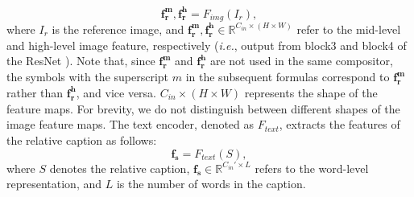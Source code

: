 \documentclass[sigconf]{acmart}
\def\ie{\emph{i.e.}}
\begin{document}
\begin{equation}
    \bm{f^m_r}, \bm{f^h_r} = F_{img}(I_r),
\end{equation}
where $I_r$  is the reference image, and $\bm{f^m_r}, \bm{f^h_r} \in \mathbb{R}^{C_{in} \times (H \times W)}$ refer to the mid-level and high-level image feature, respectively (\ie, output from block3 and block4 of the ResNet \cite{he2016deep}). Note that, since $\bm{f^m_r}$ and $\bm{f^h_r}$ are not used in the same compositor, the symbols with the superscript $m$ in the subsequent formulas correspond to $\bm{f^m_r}$ rather than $\bm{f^h_r}$, and vice versa. $C_{in} \times (H \times W)$ represents the shape of the feature maps. For brevity, we do not distinguish between different shapes of the image feature maps. 
The text encoder, denoted as $F_{text}$, extracts the features of the relative caption as follows:
\begin{equation}
    \bm{f_s} = F_{text}(S),
\end{equation}
where $S$ denotes the relative caption, $\bm{f_s} \in \mathbb{R}^{C_{in}' \times L}$ refers to the word-level representation, and $L$ is the number of words in the caption.

\iffalse
Then, we use average pooling layer followed by a distinct MLP layer, denoted as $pool$ to project the mid-level and high-level feature maps of the reference image onto an embedding space with the dimension of $C$:
\begin{equation}
\label{eq:img_proj}
    \begin{cases}
    &f^m_{x_r} = pool(x_r^m) \\
    &f^h_{x_r} = pool(x_r^h),
    \end{cases}
\end{equation}
where $f^m_{x_r}, f^h_{x_r} \in \mathbb{R}^{C}$. 
Similarly, the text features are projected onto the embedding space with the same dimension:
\begin{equation}
    \begin{cases}
    &f_s^m = pool(s) \\
    &f_s^h = pool(s),
    \end{cases}
\end{equation}
where $f_s^m, f_s^h \in \mathbb{R}^{C}$ are sentence-level representations. To note that the MLP layer are distinguished from each other, although they share the same notation $pool$.
\fi
 
\end{document}
